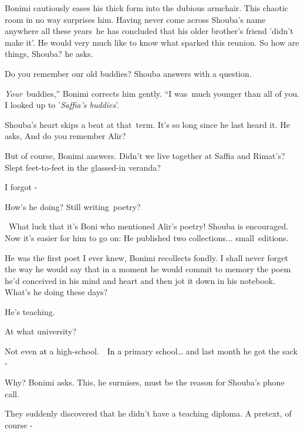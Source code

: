 \documentclass[letterpaper]{article}
\begin{document}
Bonimi cautiously eases his thick form into the dubious armchair. This chaotic room in no way surprises him. Having
never come across Shouba's name anywhere all these years\ he has concluded that his older brother's friend {}'didn't
make it{}'. He would very much like to know what sparked this reunion. {\textquotedbl}So how are things,
Shouba?{\textquotedbl} he asks.

{\textquotedbl}Do you remember our old buddies?{\textquotedbl} Shouba answers with a question.

{\textquotedbl}\textit{Your}~buddies,'' Bonimi corrects him gently. ``I was~much younger than all of you. I looked up to
'\textit{Saffia's buddies}{}'.{\textquotedbl} 

Shouba's heart skips a beat at that\ term. It's so long since he last heard it. He asks, {\textquotedbl}And do you
remember Alir?{\textquotedbl}

{\textquotedbl}But of course,{\textquotedbl} Bonimi answers. {\textquotedbl}Didn't we live together at Saffia and
Rimat's? Slept feet-to-feet in the glassed-in veranda?{\textquotedbl} 

{\textquotedbl}I forgot -{\textquotedbl} 

{\textquotedbl}How's he doing? Still writing~poetry?{\textquotedbl}

~What luck that it{}'s Boni who mentioned Alir's poetry! Shouba is encouraged. Now it's easier for him to go on:
{\textquotedbl}He published two collections...
small\textcolor[rgb]{0.0,0.4392157,0.7529412}{\ }editions.{\textquotedbl}

{\textquotedbl}He was the first poet I ever knew,{\textquotedbl} Bonimi recollects fondly. {\textquotedbl}I shall never
forget the way he would say that in a moment he would commit to memory the poem he'd conceived in his mind and heart
and then jot it down in his notebook. What's he doing these days?{\textquotedbl}

{\textquotedbl}He's teaching.{\textquotedbl}\ 

{\textquotedbl}At what university?{\textquotedbl}

{\textquotedbl}Not even \textcolor{black}{at} a high-school.\textcolor{red}{\ \ }\textcolor{black}{In a} primary
school{\dots} and last month he got the sack -{\textquotedbl} 

{\textquotedbl}Why?{\textquotedbl} Bonimi asks. This, he surmises, must be the reason for Shouba's phone call.\ 

{\textquotedbl}They suddenly discovered that he didn't have a teaching diploma. A pretext, of course -{\textquotedbl}
\end{document}
